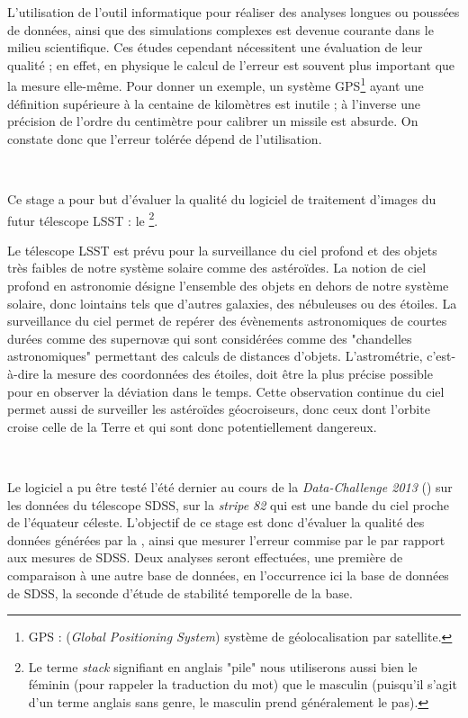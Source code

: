 
L'utilisation de l'outil informatique pour réaliser des analyses longues ou poussées de données, ainsi que des simulations complexes est devenue courante dans le milieu scientifique. Ces études cependant nécessitent une évaluation de leur qualité ; en effet, en physique le calcul de l'erreur est souvent plus important que la mesure elle-même. Pour donner un exemple, un système GPS\footnote{GPS : (\emph{Global Positioning System}) système de géolocalisation par satellite.} ayant une définition supérieure à la centaine de kilomètres est inutile ; à l'inverse une précision de l'ordre du centimètre pour calibrer un missile est absurde. On constate donc que l'erreur tolérée dépend de l'utilisation.

\ 

Ce stage a pour but d'évaluer la qualité du logiciel de traitement d'images du futur télescope LSST : le \stack\footnote{Le terme \emph{stack} signifiant en anglais "pile" nous utiliserons aussi bien le féminin (pour rappeler la traduction du mot) que le masculin (puisqu'il s'agit d'un terme anglais sans genre, le masculin prend généralement le pas).}.

Le télescope LSST est prévu pour la surveillance du ciel profond et des objets très faibles de notre système solaire comme des astéroïdes. La notion de ciel profond en astronomie désigne l'ensemble des objets en dehors de notre système solaire, donc lointains tels que d'autres galaxies, des nébuleuses ou des étoiles.
La surveillance du ciel permet de repérer des évènements astronomiques de courtes durées comme des supernovæ qui sont considérées comme des "chandelles astronomiques" permettant des calculs de distances d'objets. L'astrométrie, c'est-à-dire la mesure des coordonnées des étoiles, doit être la plus précise possible pour en observer la déviation dans le temps. Cette observation continue du ciel permet aussi de surveiller les astéroïdes géocroiseurs, donc ceux dont l'orbite croise celle de la Terre et qui sont donc potentiellement dangereux.

\ 

Le logiciel \stack{} a pu être testé l'été dernier au cours de la \emph{Data-Challenge 2013} (\DC) sur les données du télescope SDSS, sur la \emph{stripe 82} qui est une bande du ciel proche de l'équateur céleste. L'objectif de ce stage est donc d'évaluer la qualité des données générées par la \DC, ainsi que mesurer l'erreur commise par le \stack{} par rapport aux mesures de SDSS. Deux analyses seront effectuées, une première de comparaison à une autre base de données, en l'occurrence ici la base de données de SDSS, la seconde d'étude de stabilité temporelle de la base.
